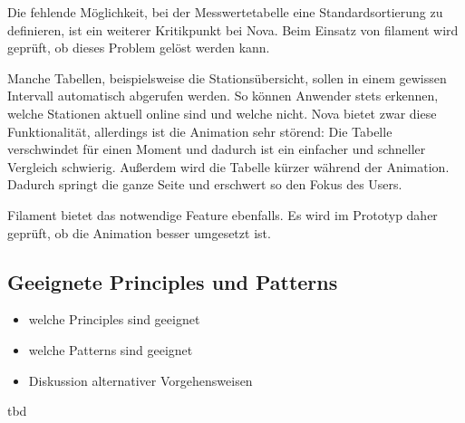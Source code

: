 \newpage

Die fehlende Möglichkeit, bei der Messwertetabelle eine Standardsortierung zu definieren, ist ein weiterer Kritikpunkt bei Nova.
Beim Einsatz von filament wird geprüft, ob dieses Problem gelöst werden kann.

Manche Tabellen, beispielsweise die Stationsübersicht, sollen in einem gewissen Intervall automatisch abgerufen werden.
So können Anwender stets erkennen, welche Stationen aktuell online sind und welche nicht.
Nova bietet zwar diese Funktionalität, allerdings ist die Animation sehr störend:
Die Tabelle verschwindet für einen Moment und dadurch ist ein einfacher und schneller Vergleich schwierig.
Außerdem wird die Tabelle kürzer während der Animation.
Dadurch springt die ganze Seite und erschwert so den Fokus des Users.

Filament bietet das notwendige Feature ebenfalls.
Es wird im Prototyp daher geprüft, ob die Animation besser umgesetzt ist.

\subsection{Geeignete Principles und Patterns}
\color{red}
\begin{itemize}
    \item welche Principles sind geeignet
    \item welche Patterns sind geeignet
    \item Diskussion alternativer Vorgehensweisen
\end{itemize}

tbd
\color{black}
